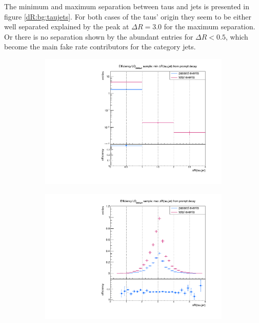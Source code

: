 %
The minimum and maximum separation between taus and jets is presented in figure \ref{dR:bg:taujets}. For both cases of the taus' origin they seem to be either well separated explained by the peak at $\Delta R=3.0$ for the maximum separation. Or there is no separation shown by the abundant entries for $\Delta R<0.5$, which become the main fake rate contributors for the category jets.\newline
%
\begin{figure}
  \centering
                \begin{subfigure}[t]{0.49\textwidth}
                \includegraphics[width=\textwidth]{figures/plots/ttH/Divided_pr_mindR_taujet.pdf}
                \label{dR:bg:prompt:taujets:min}
                \end{subfigure}
                \begin{subfigure}[t]{0.49\textwidth}
                \includegraphics[width=\textwidth]{figures/plots/ttH/Divided_maxdR_pr_taujet.pdf}

\end{subfigure}
\end{figure}
